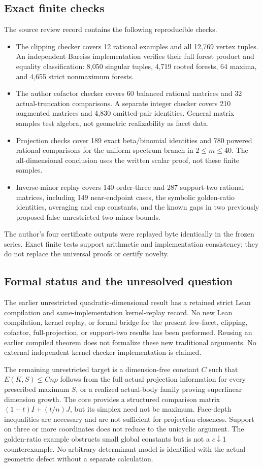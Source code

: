 \subsection{Exact finite checks}
The source review record contains the following reproducible checks.
\begin{itemize}[leftmargin=1.5em]
\item The clipping checker covers 12 rational examples and all 12,769
vertex tuples. An independent Bareiss implementation verifies their full
forest product and equality classification: 8,050 singular tuples,
4,719 rooted forests, 64 maxima, and 4,655 strict nonmaximum forests.
\item The author cofactor checker covers 60 balanced rational matrices
and 32 actual-truncation comparisons. A separate integer checker covers
210 augmented matrices and 4,830 omitted-pair identities. General matrix
samples test algebra, not geometric realizability as facet data.
\item Projection checks cover 189 exact beta/binomial identities and
780 powered rational comparisons for the uniform spectrum branch in
$2\le m\le40$. The all-dimensional conclusion uses the written scalar
proof, not these finite samples.
\item Inverse-minor replay covers 140 order-three and 287 support-two
rational matrices, including 149 near-endpoint cases, the symbolic
golden-ratio identities, averaging and cap constants, and the known gaps
in two previously proposed false unrestricted two-minor bounds.
\end{itemize}
The author's four certificate outputs were replayed byte identically in
the frozen series. Exact finite tests support arithmetic and implementation
consistency; they do not replace the universal proofs or certify novelty.

\subsection{Formal status and the unresolved question}
The earlier unrestricted quadratic-dimensional result has a retained
strict Lean compilation and same-implementation kernel-replay record.
No new Lean compilation, kernel replay, or formal bridge for the present
few-facet, clipping, cofactor, full-projection, or support-two results has
been performed. Reusing an earlier compiled theorem does not formalize
these new traditional arguments. No external independent kernel-checker
implementation is claimed.

The remaining unrestricted target is a dimension-free constant $C$ such
that $E(K,S)\le Cn\rho$ follows from the full actual projection information
for every prescribed maximum $S$, or a realized actual-body family proving
superlinear dimension growth. The core provides a structured comparison
matrix $(1-t)I+(t/n)J$, but its simplex need not be maximum. Face-depth
inequalities are necessary and are not sufficient for projection closeness.
Support on three or more coordinates does not reduce to the unicyclic
argument. The golden-ratio example obstructs small global constants but
is not a $c\downarrow1$ counterexample. No arbitrary determinant model is
identified with the actual geometric defect without a separate calculation.
